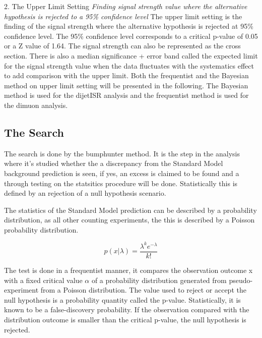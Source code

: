 2. The Upper Limit Setting
\textit{Finding signal strength value where the alternative hypothesis is rejected to a 95\% confidence level}
The upper limit setting is the finding of the signal strength where the alternative hypothesis is rejected at 95\% confidence level. The 95\% confidence level corresponds to a critical p-value of 0.05 or a Z value of 1.64. The signal strength can also be represented as the cross section. There is also a median significance + error band called the expected limit for the signal strength value when the data fluctuates with the systematics effect to add comparison with the upper limit. 
Both the frequentist and the Bayesian method on upper limit setting will be presented in the following. The Bayesian method is used for the dijetISR analysis and the frequentist method is used for the dimuon analysis. 

\subsection{The Search}
    The search is done by the bumphunter method. It is the step in the analysis where it's studied whether the a discrepancy from the Standard Model background prediction is seen, if yes, an excess is claimed to be found and a through testing on the statsitics procedure will be done. Statistically this is defined by an rejection of a null hypothesis scenario. 

    The statistics of the Standard Model prediction can be described by a probability distribution, as all other counting experiments, the this is described by a Poisson probability distribution. 

    \[ p(x|\lambda) = \frac{\lambda^{k}e^{-\lambda}}{k!} \]

    The test is done in a frequentist manner, it compares the observation outcome x with a fixed critical value $\alpha$ of a probability distribution generated from pseudo-experiment from a Poisson distribution. The value used to reject or accept the null hypothesis is a probability quantity called the p-value. Statistically, it is known to be a false-discovery probability. 
    If the observation compared with the distribution outcome is smaller than the critical p-value, the null hypothesis is rejected.  

